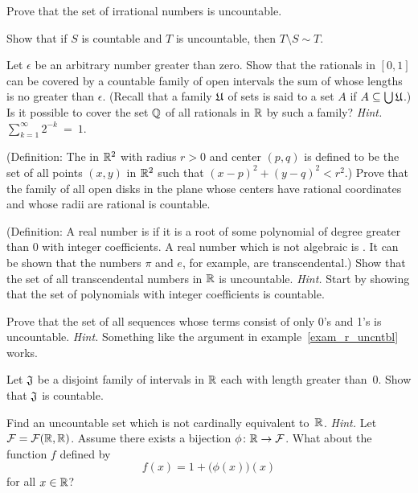 \begin{prob} Prove that the set of irrational numbers is uncountable.
\end{prob}

\begin{prob} Show that if $S$ is countable and $T$ is uncountable, then $T \setminus S  \sim T$.
\end{prob}

\begin{prob}  Let $\epsilon$ be an arbitrary number greater than zero. Show that the rationals
in $[0,1]$ can be covered by a countable family of open intervals the sum of whose
lengths is no greater than $\epsilon$. (Recall that a family $\mathfrak{U}$ of sets is said to
 a set $A$ if $A \subseteq \bigcup \mathfrak{U}$.) Is it possible to cover the set
$\mathbb{Q}$ of all rationals in $\mathbb{R}$ by such a family?  \emph{Hint.}  $\sum_{k=1}^\infty
2^{-k}~=~1$.
\end{prob}

\begin{prob} (Definition: The  in $\mathbb{R}^2$ with radius $r > 0$ and center $(p,q)$ is
defined to be the set of all points $(x,y)$ in $\mathbb{R}^2$ such that $(x - p)^2 + (y - q)^2 <
r^2$.)  Prove that the family of all open disks in the plane whose centers have rational
coordinates and whose radii are rational is countable.
\end{prob}

\begin{prob} (Definition: A real number is
 if it is a root of some polynomial of degree greater than $0$ with integer
coefficients. A real number which is not algebraic is .  It can be shown
that the numbers $\pi$ and $e$, for example, are transcendental.) Show that the set of all
transcendental numbers in $\mathbb{R}$ is uncountable.  \emph{Hint.}  Start by showing that the set of
polynomials with integer coefficients is countable.
\end{prob}

\begin{prob} Prove that the set of all sequences whose terms consist of only 0's  and 1's is
uncountable.  \emph{Hint.} Something like the argument in example~\ref{exam_r_uncntbl} works.
\end{prob}

\begin{prob} Let $\mathfrak{J}$ be a disjoint family of intervals in $\mathbb{R}$ each with length greater
than~0.  Show that $\mathfrak{J}$ is countable.
\end{prob}

\begin{prob}\label{prob_unc_notr} Find an uncountable set which is not cardinally equivalent
to~$\mathbb{R}$. \emph{Hint.}  Let $\mathcal{F} = \mathcal{F}(\mathbb{R},\mathbb{R})$. Assume there exists a bijection $\phi
\colon \mathbb{R} \rightarrow \mathcal{F}$. What about the function $f$ defined by
  \[ f(x) = 1 + \bigl(\phi(x)\bigr)(x) \]
for all $x \in \mathbb{R}$?
\end{prob}





\endinput
